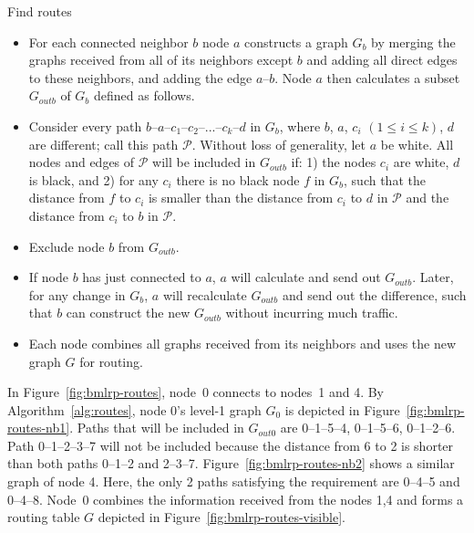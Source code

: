 \documentclass[conference]{IEEEtran}
\theoremstyle{definition}
\newcommand{\cP}{{\mathcal{P}}}
\begin{document}
\begin{algorithm}[H]
    \caption{Find routes}
    
    \begin{itemize} 

        \item   For each connected neighbor $b$ node $a$ constructs a graph $G_b$ by merging the graphs received from all of its neighbors except $b$ and adding all direct edges to these neighbors, and adding the edge $a$--$b$. Node $a$ then calculates a subset $G_{outb}$ of $G_b$ defined as follows.

        \item   Consider every path $b$--$a$--$c_1$--$c_2$--...--$c_k$--$d$ in $G_b$, where $b$, $a$, $c_i$ $(1 \le i \le k)$, $d$ are different; call this path $\cP$. Without loss of generality, let $a$ be white. All nodes and edges of $\cP$ will be included in $G_{outb}$ if: 1) the nodes $c_i$ are white, $d$ is black, and 2) for any $c_i$ there is no black node $f$ in $G_b$, such that the distance from $f$ to $c_i$ is smaller than the distance from $c_i$ to $d$ in $\cP$ and the distance from $c_i$ to $b$ in $\cP$.

        \item   Exclude node $b$ from $G_{outb}$.

        \item   If node $b$ has just connected to $a$, $a$ will calculate and send out $G_{outb}$. Later, for any change in $G_b$, $a$ will recalculate $G_{outb}$ and send out the difference, such that $b$ can construct the new $G_{outb}$ without incurring much traffic.

        \item   Each node combines all graphs received from its neighbors and uses the new graph $G$ for routing.
    \end{itemize}

    \label{alg:routes}
\end{algorithm}

In Figure~\ref{fig:bmlrp-routes}, node~0 connects to nodes~1 and 4. By 
Algorithm~\ref{alg:routes}, node 0's level-1 graph $G_0$ is depicted in Figure~\ref{fig:bmlrp-routes-nb1}. Paths that will be included in $G_{out0}$ are 0--1--5--4, 0--1--5--6, 0--1--2--6. Path 0--1--2--3--7 will not be included because the distance from 6 to 2 is shorter than both paths 0--1--2 and 2--3--7. Figure~\ref{fig:bmlrp-routes-nb2} shows a similar graph of node 4. Here, the only 2 paths satisfying the requirement are 0--4--5 and 0--4--8. Node~0 combines the information received from the nodes 1,4 and forms a routing table $G$ depicted in Figure~\ref{fig:bmlrp-routes-visible}.
\end{document}
